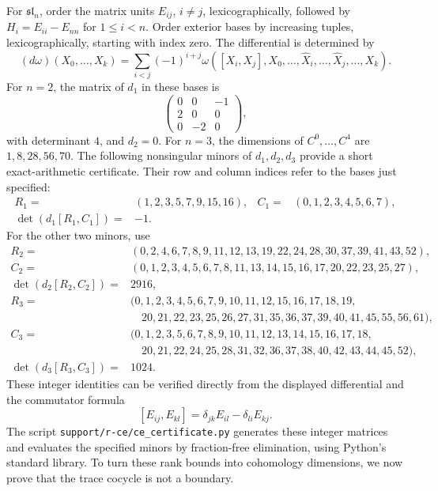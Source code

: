 For $\mathfrak{sl}_n$, order the matrix units $E_{ij}$, $i\ne j$,
lexicographically, followed by $H_i=E_{ii}-E_{nn}$ for $1\le i<n$.
Order exterior bases by increasing tuples, lexicographically, starting
with index zero.  The differential is determined by
\[
 (d\omega)(X_0,\ldots,X_k)=
 \sum_{i<j}(-1)^{i+j}
 \omega([X_i,X_j],X_0,\ldots,\widehat X_i,\ldots,
                         \widehat X_j,\ldots,X_k).
\]
For $n=2$, the matrix of $d_1$ in these bases is
\[
 \begin{pmatrix}0&0&-1\\2&0&0\\0&-2&0\end{pmatrix},
\]
with determinant $4$, and $d_2=0$.  For $n=3$, the dimensions of
$C^0,\ldots,C^4$ are $1,8,28,56,70$.  The following nonsingular
minors of $d_1,d_2,d_3$ provide a short exact-arithmetic certificate.
Their row and column indices refer to the bases just specified:
\begin{align*}
 R_1={}&(1,2,3,5,7,9,15,16),&
 C_1={}&(0,1,2,3,4,5,6,7),\\
 \det(d_1[R_1,C_1])={}&-1.&&
\end{align*}
For the other two minors, use
\begin{align*}
 R_2={}&(0,2,4,6,7,8,9,11,12,13,19,22,24,28,30,37,39,41,43,52),\\
 C_2={}&(0,1,2,3,4,5,6,7,8,11,13,14,15,16,17,20,22,23,25,27),\\
 \det(d_2[R_2,C_2])={}&2916,
\end{align*}
\begin{align*}
 R_3={}&(0,1,2,3,4,5,6,7,9,10,11,12,15,16,17,18,19,\\
       &\hspace{1em}20,21,22,23,25,26,27,31,35,36,37,39,40,41,45,55,56,61),\\
 C_3={}&(0,1,2,3,5,6,7,8,9,10,11,12,13,14,15,16,17,18,\\
       &\hspace{1em}20,21,22,24,25,28,31,32,36,37,38,40,42,43,44,45,52),\\
 \det(d_3[R_3,C_3])={}&1024.
\end{align*}
These integer identities can be verified directly from the displayed
differential and the commutator formula
\[
 [E_{ij},E_{kl}]=\delta_{jk}E_{il}-\delta_{li}E_{kj}.
\]
The script \texttt{support/r-ce/ce\_certificate.py} generates these
integer matrices and evaluates the specified minors by fraction-free
elimination, using Python's standard library. To turn these rank bounds
into cohomology dimensions, we now prove that the trace cocycle is not
a boundary.

